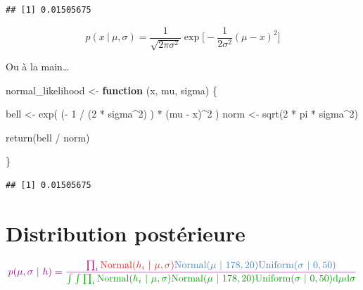 \documentclass[
  a4paper,11pt,twoside,onecolumn,openright,final,oldfontcommands]{memoir}
\newenvironment{Shaded}{\begin{snugshade}}{\end{snugshade}}
\newcommand{\ControlFlowTok}[1]{\textcolor[rgb]{0.13,0.29,0.53}{\textbf{#1}}}
\newcommand{\DecValTok}[1]{\textcolor[rgb]{0.00,0.00,0.81}{#1}}
\newcommand{\FunctionTok}[1]{\textcolor[rgb]{0.00,0.00,0.00}{#1}}
\newcommand{\NormalTok}[1]{#1}
\newcommand{\OtherTok}[1]{\textcolor[rgb]{0.56,0.35,0.01}{#1}}
\newcommand{\SpecialCharTok}[1]{\textcolor[rgb]{0.00,0.00,0.00}{#1}}
\theoremstyle{definition}
\theoremstyle{definition}
\theoremstyle{definition}
\theoremstyle{definition}
\theoremstyle{remark}
\begin{document}
\begin{verbatim}
## [1] 0.01505675
\end{verbatim}

\[
p(x \ | \ \mu, \sigma) = \frac{1}{\sqrt{2 \pi \sigma^{2}}} \exp \bigg[-\frac{1}{2 \sigma^{2}} (\mu - x)^{2} \bigg]
\]

Ou à la main\ldots{}

\begin{Shaded}
\begin{Highlighting}[]
\NormalTok{normal\_likelihood }\OtherTok{\textless{}{-}} \ControlFlowTok{function}\NormalTok{ (x, mu, sigma) \{}
  
\NormalTok{  bell }\OtherTok{\textless{}{-}} \FunctionTok{exp}\NormalTok{( (}\SpecialCharTok{{-}} \DecValTok{1} \SpecialCharTok{/}\NormalTok{ (}\DecValTok{2} \SpecialCharTok{*}\NormalTok{ sigma}\SpecialCharTok{\^{}}\DecValTok{2}\NormalTok{) ) }\SpecialCharTok{*}\NormalTok{ (mu }\SpecialCharTok{{-}}\NormalTok{ x)}\SpecialCharTok{\^{}}\DecValTok{2}\NormalTok{ )}
\NormalTok{  norm }\OtherTok{\textless{}{-}} \FunctionTok{sqrt}\NormalTok{(}\DecValTok{2} \SpecialCharTok{*}\NormalTok{ pi }\SpecialCharTok{*}\NormalTok{ sigma}\SpecialCharTok{\^{}}\DecValTok{2}\NormalTok{)}
  
  \FunctionTok{return}\NormalTok{(bell }\SpecialCharTok{/}\NormalTok{ norm)}
  
\NormalTok{\}}
\end{Highlighting}
\end{Shaded}

\begin{Shaded}
\end{Shaded}

\begin{verbatim}
## [1] 0.01505675
\end{verbatim}

\hypertarget{distribution-postuxe9rieure}{%
\section{Distribution postérieure}\label{distribution-postuxe9rieure}}

\[
\color{purple}{p(\mu, \sigma \ | \ h)} = \frac{\prod_{i} \color{orangered}{\mathrm{Normal}(h_{i} \ | \ \mu, \sigma)}\color{steelblue}{\mathrm{Normal}(\mu \ | \ 178, 20)\mathrm{Uniform}(\sigma \ | \ 0, 50)}}
{\color{green}{\int \int \prod_{i} \mathrm{Normal}(h_{i} \ | \ \mu, \sigma)\mathrm{Normal}(\mu \ | \ 178, 20)\mathrm{Uniform}(\sigma \ | \ 0, 50) \mathrm{d} \mu \mathrm{d} \sigma}}
\]
\end{document}
